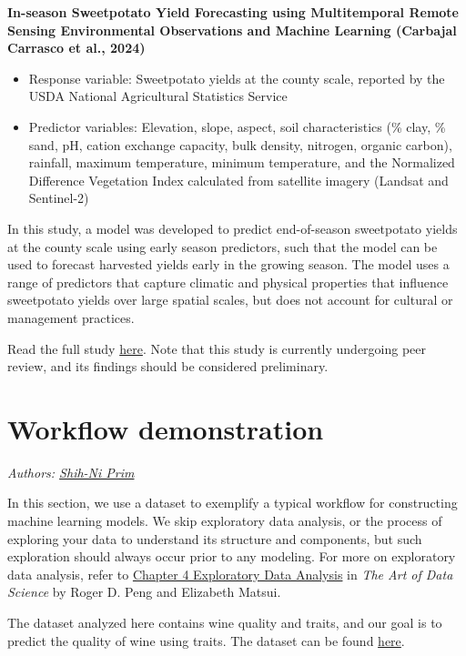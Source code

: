 \documentclass[
]{book}
\providecommand{\tightlist}{%
  \setlength{\itemsep}{0pt}\setlength{\parskip}{0pt}}
\begin{document}
\textbf{In-season Sweetpotato Yield Forecasting using Multitemporal Remote Sensing Environmental Observations and Machine Learning (Carbajal Carrasco et al., 2024)}

\begin{itemize}
\tightlist
\item
  Response variable: Sweetpotato yields at the county scale, reported by the USDA National Agricultural Statistics Service
\item
  Predictor variables: Elevation, slope, aspect, soil characteristics (\% clay, \% sand, pH, cation exchange capacity, bulk density, nitrogen, organic carbon), rainfall, maximum temperature, minimum temperature, and the Normalized Difference Vegetation Index calculated from satellite imagery (Landsat and Sentinel-2)
\end{itemize}

In this study, a model was developed to predict end-of-season sweetpotato yields at the county scale using early season predictors, such that the model can be used to forecast harvested yields early in the growing season. The model uses a range of predictors that capture climatic and physical properties that influence sweetpotato yields over large spatial scales, but does not account for cultural or management practices.

Read the full study \href{https://doi.org/10.22541/essoar.171415899.94920111/v1}{here}. Note that this study is currently undergoing peer review, and its findings should be considered preliminary.

\hypertarget{workflow}{%
\chapter{Workflow demonstration}\label{workflow}}

\emph{Authors: \href{https://www.linkedin.com/in/shih-ni-prim-14033336/}{Shih-Ni Prim}}

In this section, we use a dataset to exemplify a typical workflow for constructing machine learning models. We skip exploratory data analysis, or the process of exploring your data to understand its structure and components, but such exploration should always occur prior to any modeling. For more on exploratory data analysis, refer to \href{https://bookdown.org/rdpeng/artofdatascience/exploratory-data-analysis.html}{Chapter 4 Exploratory Data Analysis} in \emph{The Art of Data Science} by Roger D. Peng and Elizabeth Matsui.

The dataset analyzed here contains wine quality and traits, and our goal is to predict the quality of wine using traits. The dataset can be found \href{https://www.kaggle.com/datasets/yasserh/wine-quality-dataset}{here}.
\end{document}

